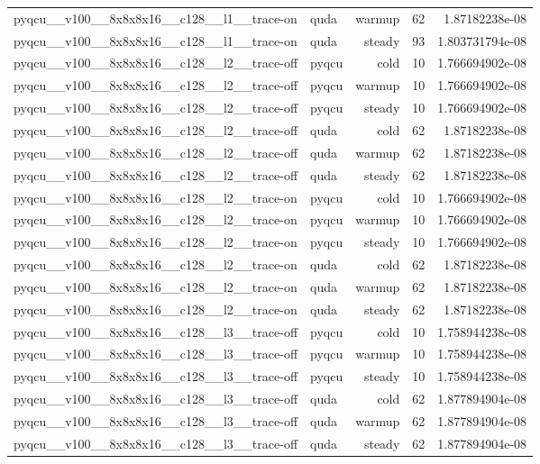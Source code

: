 \begin{table}[htbp]
\begin{tabular}{@{}llrrr@{}}
pyqcu\_\_v100\_\_8x8x8x16\_\_c128\_\_l1\_\_trace-on & quda & warmup & 62 & 1.87182238e-08 \\
pyqcu\_\_v100\_\_8x8x8x16\_\_c128\_\_l1\_\_trace-on & quda & steady & 93 & 1.803731794e-08 \\
pyqcu\_\_v100\_\_8x8x8x16\_\_c128\_\_l2\_\_trace-off & pyqcu & cold & 10 & 1.766694902e-08 \\
pyqcu\_\_v100\_\_8x8x8x16\_\_c128\_\_l2\_\_trace-off & pyqcu & warmup & 10 & 1.766694902e-08 \\
pyqcu\_\_v100\_\_8x8x8x16\_\_c128\_\_l2\_\_trace-off & pyqcu & steady & 10 & 1.766694902e-08 \\
pyqcu\_\_v100\_\_8x8x8x16\_\_c128\_\_l2\_\_trace-off & quda & cold & 62 & 1.87182238e-08 \\
pyqcu\_\_v100\_\_8x8x8x16\_\_c128\_\_l2\_\_trace-off & quda & warmup & 62 & 1.87182238e-08 \\
pyqcu\_\_v100\_\_8x8x8x16\_\_c128\_\_l2\_\_trace-off & quda & steady & 62 & 1.87182238e-08 \\
pyqcu\_\_v100\_\_8x8x8x16\_\_c128\_\_l2\_\_trace-on & pyqcu & cold & 10 & 1.766694902e-08 \\
pyqcu\_\_v100\_\_8x8x8x16\_\_c128\_\_l2\_\_trace-on & pyqcu & warmup & 10 & 1.766694902e-08 \\
pyqcu\_\_v100\_\_8x8x8x16\_\_c128\_\_l2\_\_trace-on & pyqcu & steady & 10 & 1.766694902e-08 \\
pyqcu\_\_v100\_\_8x8x8x16\_\_c128\_\_l2\_\_trace-on & quda & cold & 62 & 1.87182238e-08 \\
pyqcu\_\_v100\_\_8x8x8x16\_\_c128\_\_l2\_\_trace-on & quda & warmup & 62 & 1.87182238e-08 \\
pyqcu\_\_v100\_\_8x8x8x16\_\_c128\_\_l2\_\_trace-on & quda & steady & 62 & 1.87182238e-08 \\
pyqcu\_\_v100\_\_8x8x8x16\_\_c128\_\_l3\_\_trace-off & pyqcu & cold & 10 & 1.758944238e-08 \\
pyqcu\_\_v100\_\_8x8x8x16\_\_c128\_\_l3\_\_trace-off & pyqcu & warmup & 10 & 1.758944238e-08 \\
pyqcu\_\_v100\_\_8x8x8x16\_\_c128\_\_l3\_\_trace-off & pyqcu & steady & 10 & 1.758944238e-08 \\
pyqcu\_\_v100\_\_8x8x8x16\_\_c128\_\_l3\_\_trace-off & quda & cold & 62 & 1.877894904e-08 \\
pyqcu\_\_v100\_\_8x8x8x16\_\_c128\_\_l3\_\_trace-off & quda & warmup & 62 & 1.877894904e-08 \\
pyqcu\_\_v100\_\_8x8x8x16\_\_c128\_\_l3\_\_trace-off & quda & steady & 62 & 1.877894904e-08 \\

\end{tabular}
\end{table}
